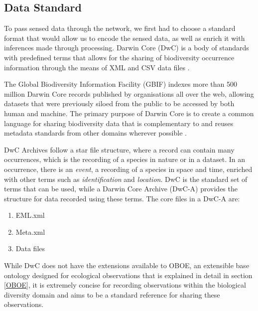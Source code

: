 	\subsection{Data Standard}\label{arch:tech:dwc}
		To pass sensed data through the network, we first had to choose a standard format that would allow us to encode the sensed data, as well as enrich it with inferences made through processing. Darwin Core (DwC) is a body of standards with predefined terms that allows for the sharing of biodiversity occurrence information through the means of XML and CSV data files \cite{wieczorek2012}.

The Global Biodiversity Information Facility (GBIF)\cite{gbif} indexes more than 500 million Darwin Core records published by organisations all over the web, allowing datasets that were previously siloed from the public to be accessed by both human and machine. The primary purpose of Darwin Core is to create a common language for sharing biodiversity data that is complementary to and reuses metadata standards from other domains wherever possible \cite{wieczorek2012}.

DwC Archives follow a star file structure, where a record can contain many occurrences, which is the recording of a species in nature or in a dataset. In an occurrence, there is an \textit{event}, a recording of a species in space and time, enriched with other terms such as \textit{identification} and \textit{location}. DwC is the standard set of terms that can be used, while a Darwin Core Archive (DwC-A) provides the structure for data recorded using these terms. The core files in a DwC-A are:
\begin{enumerate}
	\item EML.xml
	\item Meta.xml
	\item Data files
\end{enumerate}
While DwC does not have the extensions available to OBOE, an extensible base ontology designed for ecological observations that is explained in detail in section \ref{OBOE}, it is extremely concise for recording observations within the biological diversity domain and aims to be a standard reference for sharing these observations.


